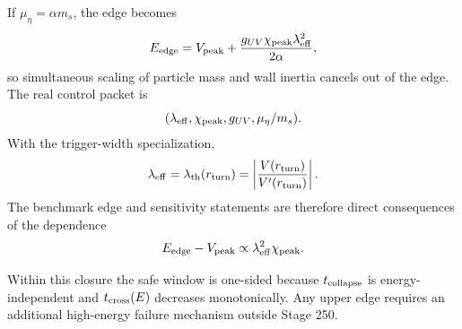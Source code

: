 If \(\mu_\eta=\alpha m_s\), the edge becomes
\begin{equation}
\label{eq:app-part08-stage250-heavy-edge}
E_{\rm edge}=V_{\rm peak}+\frac{g_{UV}\chi_{\rm peak}\lambda_{\rm eff}^{2}}{2\alpha},
\end{equation}
so simultaneous scaling of particle mass and wall inertia cancels out of the edge.  The real control packet is
\begin{equation}
\label{eq:app-part08-stage250-control-packet}
(\lambda_{\rm eff},\chi_{\rm peak},g_{UV},\mu_\eta/m_s).
\end{equation}
With the trigger-width specialization,
\begin{equation}
\label{eq:app-part08-stage250-trigger-width}
\lambda_{\rm eff}=\lambda_{\rm th}(r_{\rm turn})=
\left|\frac{V(r_{\rm turn})}{V'(r_{\rm turn})}\right|.
\end{equation}
The benchmark edge and sensitivity statements are therefore direct consequences of the dependence
\begin{equation}
\label{eq:app-part08-stage250-edge-sensitivity}
E_{\rm edge}-V_{\rm peak}\propto\lambda_{\rm eff}^{2}\chi_{\rm peak}.
\end{equation}

Within this closure the safe window is one-sided because \(t_{\rm collapse}\) is energy-independent and \(t_{\rm cross}(E)\) decreases monotonically.  Any upper edge requires an additional high-energy failure mechanism outside Stage 250.

